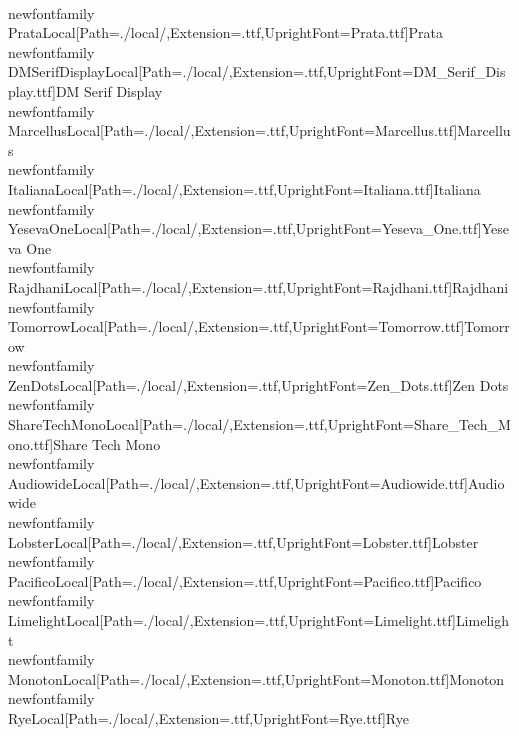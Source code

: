 \\newfontfamily\\PrataLocal[Path=./local/,Extension=.ttf,UprightFont={Prata.ttf}]{Prata}
\\newfontfamily\\DMSerifDisplayLocal[Path=./local/,Extension=.ttf,UprightFont={DM_Serif_Display.ttf}]{DM Serif Display}
\\newfontfamily\\MarcellusLocal[Path=./local/,Extension=.ttf,UprightFont={Marcellus.ttf}]{Marcellus}
\\newfontfamily\\ItalianaLocal[Path=./local/,Extension=.ttf,UprightFont={Italiana.ttf}]{Italiana}
\\newfontfamily\\YesevaOneLocal[Path=./local/,Extension=.ttf,UprightFont={Yeseva_One.ttf}]{Yeseva One}
\\newfontfamily\\RajdhaniLocal[Path=./local/,Extension=.ttf,UprightFont={Rajdhani.ttf}]{Rajdhani}
\\newfontfamily\\TomorrowLocal[Path=./local/,Extension=.ttf,UprightFont={Tomorrow.ttf}]{Tomorrow}
\\newfontfamily\\ZenDotsLocal[Path=./local/,Extension=.ttf,UprightFont={Zen_Dots.ttf}]{Zen Dots}
\\newfontfamily\\ShareTechMonoLocal[Path=./local/,Extension=.ttf,UprightFont={Share_Tech_Mono.ttf}]{Share Tech Mono}
\\newfontfamily\\AudiowideLocal[Path=./local/,Extension=.ttf,UprightFont={Audiowide.ttf}]{Audiowide}
\\newfontfamily\\LobsterLocal[Path=./local/,Extension=.ttf,UprightFont={Lobster.ttf}]{Lobster}
\\newfontfamily\\PacificoLocal[Path=./local/,Extension=.ttf,UprightFont={Pacifico.ttf}]{Pacifico}
\\newfontfamily\\LimelightLocal[Path=./local/,Extension=.ttf,UprightFont={Limelight.ttf}]{Limelight}
\\newfontfamily\\MonotonLocal[Path=./local/,Extension=.ttf,UprightFont={Monoton.ttf}]{Monoton}
\\newfontfamily\\RyeLocal[Path=./local/,Extension=.ttf,UprightFont={Rye.ttf}]{Rye}
